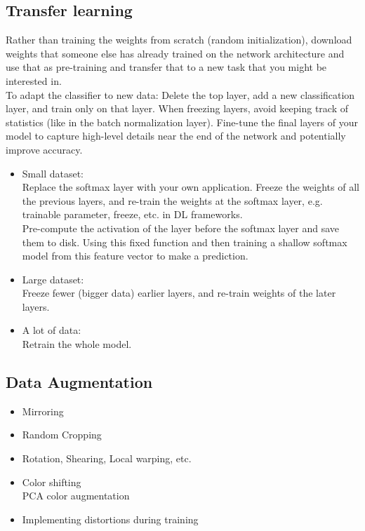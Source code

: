 \subsection{Transfer learning}
Rather than training the weights from scratch (random initialization), download weights that someone else has already trained on the network architecture and use that as pre-training and transfer that to a new task that you might be interested in.\\
To adapt the classifier to new data: Delete the top layer, add a new classification layer, and train only on that layer. When freezing layers, avoid keeping track of statistics (like in the batch normalization layer). Fine-tune the final layers of your model to capture high-level details near the end of the network and potentially improve accuracy.
\begin{itemize}
\item
Small dataset:\\
Replace the softmax layer with your own application. Freeze the weights of all the previous layers, and re-train the weights at the softmax layer, e.g. trainable parameter, freeze, etc. in DL frameworks.\\
Pre-compute the activation of the layer before the softmax layer and save them to disk. Using this fixed function and then training a shallow softmax model from this feature vector to make a prediction.
\item
Large dataset:\\
Freeze fewer (bigger data) earlier layers, and re-train weights of the later layers.
\item
A lot of data:\\
Retrain the whole model.
\end{itemize}

%
\subsection{Data Augmentation}
\begin{itemize}
\item[]
Mirroring
\item[]
Random Cropping
\item[]
Rotation, Shearing, Local warping, etc.
\item[]
Color shifting\\
PCA color augmentation
\item[]
Implementing distortions during training
\end{itemize}

